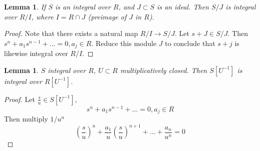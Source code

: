 \documentclass[12pt]{article}
\newtheorem{lemma}[theorem]{Lemma}
\theoremstyle{definition}
\begin{document}
\begin{lemma}
If $S$ is an integral over $R$, and $J \subset S$ is an ideal. Then $S/J$ is integral over $R/I$, where $I = R\cap J$ (preimage of $J$ in $R$).
\end{lemma}
\begin{proof}
Note that there exists a natural map $R/I \rightarrow S/J$. Let $s+J \in S/J$. Then $s^n+a_1s^{n-1}+\dots = 0, a_j\in R$. Reduce this module $J$ to conclude that $s+j$ is likewise integral over $R/I$.
\end{proof}
\begin{lemma}
$S$ integral over $R$, $U\subset R$ multiplicatively closed. Then $S[U^{-1}]$ is integral over $R[U^{-1}]$.
\end{lemma}
\begin{proof}
Let $\frac{s}{u}\in S[U^{-1}]$, 
\[
s^n+a_1s^{n-1}+\dots =0,a_j \in R
\]
Then multiply $1/u^n$
\[
(\frac{s}{u})^n + \frac{a_1}{u}(\frac{s}{u})^{n+1}+ \dots + \frac{a_n}{u^n} = 0 
\]

\end{proof}
\end{document}
